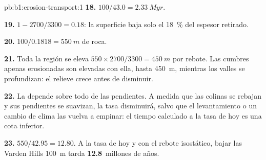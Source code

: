 \begin{solution}{pb:b1:erosion-transport:1}
\textbf{18.} $100/43.0 = \qty{2.33}{Myr}$.

\textbf{19.} $1 - 2700/3300 = 0.18$: la superficie baja solo el
\qty{18}{\percent} del espesor retirado.

\textbf{20.} $100/0.1818 = \qty{550}{m}$ de roca.

\textbf{21.} Toda la región se eleva $550 \times 2700/3300 = \qty{450}{m}$ por rebote. Las cumbres apenas erosionadas son elevadas con ella, hasta
\qty{450}{m}, mientras los valles se profundizan: el relieve crece antes de disminuir.

\textbf{22.} La  depende sobre todo de las pendientes. A medida que las colinas se rebajan y sus pendientes se suavizan, la tasa
disminuirá, salvo que el levantamiento o un cambio de clima las vuelva a empinar: el tiempo calculado a la tasa de hoy es una cota inferior.

\textbf{23.} $550/42.95 = 12.80$. A la tasa de hoy y con el rebote isostático,
bajar las Varden Hills \qty{100}{m} tarda \textbf{12.8}~millones de años.
\end{solution}
